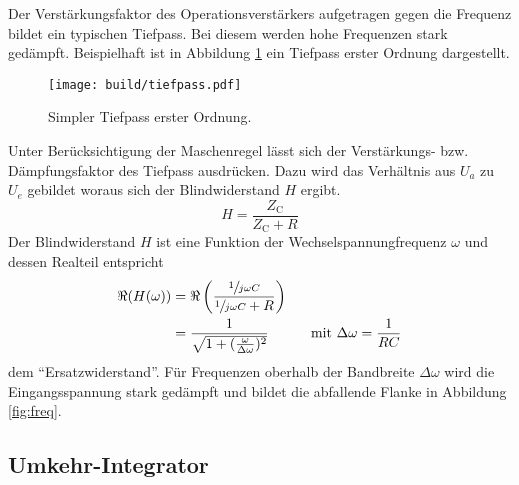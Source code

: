 Der Verstärkungsfaktor des Operationsverstärkers aufgetragen gegen die Frequenz bildet ein typischen Tiefpass.
Bei diesem werden hohe Frequenzen stark gedämpft.
Beispielhaft ist in Abbildung \ref{fig:tiefpass} ein Tiefpass erster Ordnung
dargestellt.
\begin{figure}[ht]
		\centering
		\texttt{[image: build/tiefpass.pdf]}
		\caption{Simpler Tiefpass erster Ordnung. \cite{wiki}}
		\label{fig:tiefpass}
\end{figure}
Unter Berücksichtigung der Maschenregel lässt sich der Verstärkungs- bzw.
Dämpfungsfaktor des Tiefpass ausdrücken.
Dazu wird das Verhältnis aus $U_a$ zu $U_e$ gebildet woraus sich der
Blindwiderstand $H$ ergibt.
\begin{equation}
		\label{eq:blindwiederstand}
		H = \frac{Z_\text{C}}{Z_\text{C} + R}
\end{equation}
Der Blindwiderstand $H$ ist eine Funktion der Wechselspannungfrequenz $\omega$
und dessen Realteil entspricht
\begin{align}
		\Re(H(\omega))  &= \Re \left(\frac{\sfrac{1}{j \omega C}}{\sfrac{1}{j\omega
    C} + R} \right) \label{eq:h_betrag} \\
		&= \frac{1}{\sqrt{1 + (\frac{\omega}{\Delta \omega} )^2}} \,
		\hspace{1cm} \text{mit } \Delta \omega = \frac{1}{RC}
		\label{eq:tiefpass}
\end{align}
dem \enquote{Ersatzwiderstand}.
Für Frequenzen oberhalb der Bandbreite $\Delta \omega$ wird die Eingangsspannung
stark gedämpft und bildet die abfallende Flanke in Abbildung \ref{fig:freq}.

\subsection{Umkehr-Integrator}%
\label{sub:umkehr_integrator}

